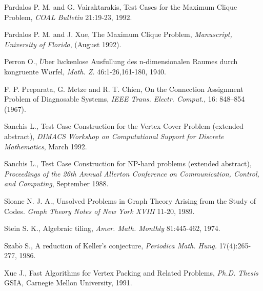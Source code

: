 \begin{thebibliography}{100}
Pardalos P. M. and G. Vairaktarakis, Test Cases for the Maximum Clique Problem,
{\it COAL Bulletin} 21:19-23, 1992.

Pardalos P. M. and J. Xue, The Maximum Clique Problem,
{\em Manuscript, University of Florida}, (August 1992).

Perron O., $\ddot{U}$ber l$\ddot{u}$ckenlose Ausfullung des n-dimensionalen Raumes
durch kongruente W$\ddot{u}$rfel, {\it Math. Z.} 46:1-26,161-180, 1940.

 F. P. Preparata, G. Metze and R. T. Chien, On the
Connection Assignment Problem of Diagnosable Systems, {\em IEEE Trans.
Electr. Comput.}, 16: 848--854 (1967).

Sanchis L., Test Case Construction for the Vertex Cover Problem (extended
abstract), {\it DIMACS Workshop on Computational Support for Discrete
Mathematics}, March 1992.

Sanchis L., Test Case Construction for NP-hard problems
(extended abstract), {\em Proceedings of the 26th Annual Allerton
Conference on Communication, Control, and Computing}, September 1988.

Sloane N. J. A., Unsolved Problems in Graph Theory Arising from the Study of
Codes. {\it Graph Theory Notes of New York XVIII} 11-20, 1989.

Stein S. K., Algebraic tiling, {\it Amer. Math. Monthly} 81:445-462, 1974.

Szab$\acute{o}$ S., A reduction of Keller's conjecture, {\it Periodica
Math. Hung.} 17(4):265-277, 1986.

Xue J., Fast Algorithms for Vertex Packing and Related Problems, {\it Ph.D.
Thesis} GSIA, Carnegie Mellon University, 1991.
\end{thebibliography}




